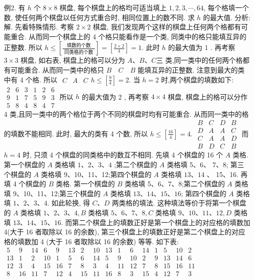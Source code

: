 例2. 有 $h$ 个 $8 \times 8$ 棋盘, 每个棋盘上的格均可适当填上 $1,2,3, \cdots, 64$, 每个格填一个数, 使任何两个棋盘以任何方式重合时, 相同位置上的数不同.
求 $h$ 的最大值.
分析:解.
先看特殊情形.
考察 $2 \times 2$ 棋盘, 我们发现两个这样的棋盘上任何两个格都有可能重合.
从而同一个棋盘上的 4 个格只能看作是一个类, 同类中的格只能填互异的正整数.
所以 $h \leqslant\left[\frac{\text { 填数的个数 }}{\text { 同类格的个数 }}\right]=\left[\frac{2 \times 2}{4}\right]=1$. 此时 $h$ 的最大值为 1 .
再考察 $3 \times 3$ 棋盘, 如右表, 棋盘上的格可以分为 $A 、 B 、 C 三$ 类,同一类中的任何两个格都有可能重合.
从而同一类中的格只
$B \quad C \quad B$ 能填互异的正整数.
注意到最大的类中有 4 个格.
所以
$\begin{array}{llll}C & A & C\end{array} h \leqslant\left[\frac{9}{4}\right]=2$.
当 $h=2$ 时,两个棋盘的填数如下:
$\begin{array}{llllll}2 & 6 & 3 & 1 & 2 & 6 \\ 9 & 1 & 7 & 5 & 9 & 3 \\ 5 & 8 & 4 & 8 & 4 & 7\end{array}$
所以 $h$ 的最大值为 2 ,
再考察 $4 \times 4$ 棋盘, 棋盘上的格可以分作 4 类,且同一类中的两个格位于两个不同的棋盘时均有可能重合.
从而同一类中的格的填数不能相同.
此时, 最大的类有 4 个数, 所以 $h \leqslant\left[\frac{16}{4}\right]=4$.
$\begin{array}{llll}B & C & D & B \\ D & A & A & C \\ C & A & A & D \\ B & D & C & B\end{array}$
而 $h=4$ 时, 只须 4 个棋盘的同类格中的数互不相同.
先填 4 个棋盘的 16
个 $A$ 类格.
第一个棋盘的 $A$ 类格填 $1 、 2 、 3 、 4$ ;第二个棋盘的 $A$ 类格填 5、6、 $7 、 8$; 第三个棋盘的 $A$ 类格填 9、10、11、12;第四个棋盘的 $A$ 类格填 $13 、 14$ 、 15、16. 再填 4 个棋盘的 $B$ 类格.
第一个棋盘的 $B$ 类格填 5、6、7、8;第二个棋盘的 $A$ 类格填 9、10、11、12;第三个棋盘的 $A$ 类格填 $13 、 14 、 15 、 16$; 第四个棋盘的 $A$ 类格填 $1 、 2 、 3 、 4$. 如此轮换, 得 $C 、 D$ 两类格的填法.
这种填法等价于将第一个棋盘的 $A$ 类格填 $1 、 2 、 3 、 4, B$ 类格填 $5 、 6 、 7 、 8, C$ 类格填 $9 、 10 、 11 、 12, D$ 类格填 $13 、 14 、 15 、 16$. 而第二个棋盘上的填数正好是第一个棋盘上的对应格的填数加 4(大于 16 者取除以 16 的余数), 第三个棋盘上的填数正好是第二个棋盘上的对应格的填数加 4 (大于 16 者取除以 16 的余数) 等等.
如下表:
$\begin{array}{rrrrrrrrrrrrrrrr}5 & 9 & 14 & 6 & 9 & 13 & 2 & 10 & 13 & 1 & 6 & 14 & 1 & 5 & 10 & 2 \\ 13 & 1 & 2 & 10 & 1 & 5 & 6 & 14 & 5 & 9 & 10 & 2 & 9 & 13 & 14 & 6 \\ 12 & 3 & 4 & 15 & 16 & 7 & 8 & 3 & 4 & 11 & 12 & 7 & 8 & 15 & 16 & 11 \\ 8 & 16 & 11 & 7 & 12 & 4 & 15 & 11 & 16 & 8 & 3 & 15 & 4 & 12 & 7 & 3\end{array}$

